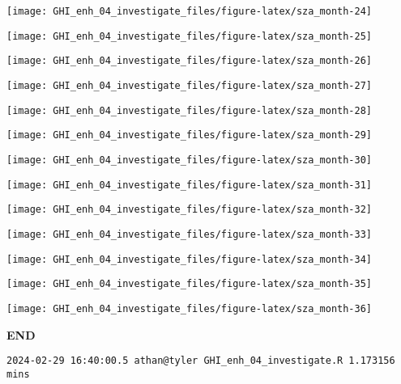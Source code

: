 \documentclass[
  10pt,
  a4paper,oneside]{article}
\begin{document}
\begin{center}\texttt{[image: GHI\_enh\_04\_investigate\_files/figure-latex/sza\_month-24]} \end{center}

\begin{center}\texttt{[image: GHI\_enh\_04\_investigate\_files/figure-latex/sza\_month-25]} \end{center}

\begin{center}\texttt{[image: GHI\_enh\_04\_investigate\_files/figure-latex/sza\_month-26]} \end{center}

\begin{center}\texttt{[image: GHI\_enh\_04\_investigate\_files/figure-latex/sza\_month-27]} \end{center}

\begin{center}\texttt{[image: GHI\_enh\_04\_investigate\_files/figure-latex/sza\_month-28]} \end{center}

\begin{center}\texttt{[image: GHI\_enh\_04\_investigate\_files/figure-latex/sza\_month-29]} \end{center}

\begin{center}\texttt{[image: GHI\_enh\_04\_investigate\_files/figure-latex/sza\_month-30]} \end{center}

\begin{center}\texttt{[image: GHI\_enh\_04\_investigate\_files/figure-latex/sza\_month-31]} \end{center}

\begin{center}\texttt{[image: GHI\_enh\_04\_investigate\_files/figure-latex/sza\_month-32]} \end{center}

\begin{center}\texttt{[image: GHI\_enh\_04\_investigate\_files/figure-latex/sza\_month-33]} \end{center}

\begin{center}\texttt{[image: GHI\_enh\_04\_investigate\_files/figure-latex/sza\_month-34]} \end{center}

\begin{center}\texttt{[image: GHI\_enh\_04\_investigate\_files/figure-latex/sza\_month-35]} \end{center}

\begin{center}\texttt{[image: GHI\_enh\_04\_investigate\_files/figure-latex/sza\_month-36]} \end{center}

\textbf{END}

\begin{verbatim}
2024-02-29 16:40:00.5 athan@tyler GHI_enh_04_investigate.R 1.173156 mins
\end{verbatim}
\end{document}
